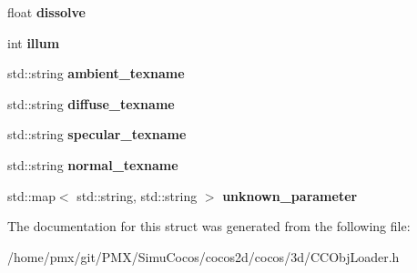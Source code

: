 \begin{DoxyCompactItemize}
float {\bfseries dissolve}
\item 
\mbox{\label{structtinyobj_1_1material__t_af846245315bd70c1a4f815dfdd6b80cc}} 
int {\bfseries illum}
\item 
\mbox{\label{structtinyobj_1_1material__t_ae988eed637f368374becbb672798a45e}} 
std\+::string {\bfseries ambient\+\_\+texname}
\item 
\mbox{\label{structtinyobj_1_1material__t_ad7f71a301a261fca07d2e50edccc792d}} 
std\+::string {\bfseries diffuse\+\_\+texname}
\item 
\mbox{\label{structtinyobj_1_1material__t_aed8c38d64472ba0db5186dba800b1b34}} 
std\+::string {\bfseries specular\+\_\+texname}
\item 
\mbox{\label{structtinyobj_1_1material__t_a7512ccf46044357bea1739d583871578}} 
std\+::string {\bfseries normal\+\_\+texname}
\item 
\mbox{\label{structtinyobj_1_1material__t_afc88ecef64bba449597c6983b7db254d}} 
std\+::map$<$ std\+::string, std\+::string $>$ {\bfseries unknown\+\_\+parameter}
\end{DoxyCompactItemize}


The documentation for this struct was generated from the following file\+:\begin{DoxyCompactItemize}
\item 
/home/pmx/git/\+P\+M\+X/\+Simu\+Cocos/cocos2d/cocos/3d/C\+C\+Obj\+Loader.\+h\end{DoxyCompactItemize}
